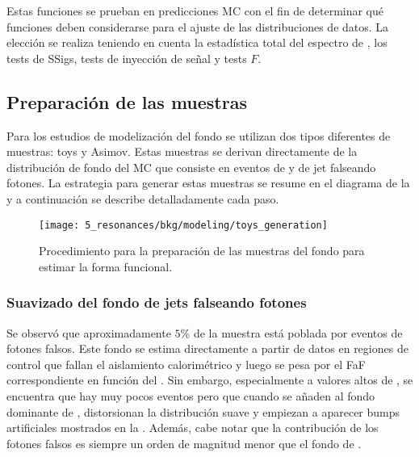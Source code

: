 Estas funciones se prueban en predicciones \ac{MC} con el fin de determinar qué funciones deben considerarse para el ajuste de las distribuciones de datos.
La elección se realiza teniendo en cuenta la estadística total del espectro de \myj, los tests de \acp{SSig}, tests de inyección de señal y tests \(F\).










\subsection{Preparación de las muestras}
\label{subsec:bkg:modeling:preparation}

Para los estudios de modelización del fondo se utilizan dos tipos diferentes de muestras: toys y Asimov. Estas muestras se derivan directamente de la distribución de fondo del \ac{MC} que consiste en eventos de \gammajet y de jet falseando fotones. La estrategia para generar estas muestras se resume en el diagrama de la \Fig{\ref{fig:bkg:modeling:preparation:datasets_generation}} y a continuación se describe detalladamente cada paso.

\begin{figure}[ht!]
    \centering
    \texttt{[image: 5\_resonances/bkg/modeling/toys\_generation]}
    \caption{Procedimiento para la preparación de las muestras del fondo para estimar la forma funcional.}
    \label{fig:bkg:modeling:preparation:datasets_generation}
\end{figure}




\subsubsection{Suavizado del fondo de jets falseando fotones}
\label{subsubsec:bkg:modeling:preparation:jfakes_smooth}


Se observó que aproximadamente \(5\%\) de la muestra \gammajet está poblada por eventos de fotones falsos. Este fondo se estima directamente a partir de datos en regiones de control que fallan el aislamiento calorimétrico y luego se pesa por el \ac{FaF} correspondiente en función del \ptgam. Sin embargo, especialmente a valores altos de \myj, se encuentra que hay muy pocos eventos pero que cuando se añaden al fondo dominante de \gammajet, distorsionan la distribución suave y empiezan a aparecer bumps artificiales mostrados en la \Fig{\ref{fig:bkg:modeling:preparation:jfakes_smooth:bkg_myj_distribution}}.
Además, cabe notar que la contribución de los fotones falsos es siempre un orden de magnitud menor que el fondo de \gammajet.

